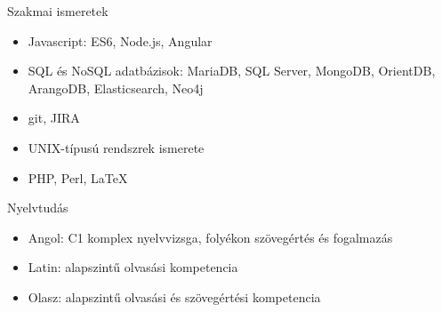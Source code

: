 \documentclass[12pt,oneside,a4paper]{article}
\begin{document}
Szakmai ismeretek

  \begin{itemize}
    \item{ Javascript: ES6, Node.js, Angular }
    \item{ SQL és NoSQL adatbázisok: MariaDB, SQL Server, 
      MongoDB, OrientDB, ArangoDB, Elasticsearch, Neo4j }
    \item{ git, JIRA }
    \item{ UNIX-típusú rendszrek ismerete }
    \item{ PHP, Perl, \LaTeX}
  \end{itemize}

Nyelvtudás
  
  \begin{itemize}
    \item{ Angol: C1 komplex nyelvvizsga, folyékon szövegértés és fogalmazás }
    \item{ Latin: alapszintű olvasási kompetencia }
    \item{ Olasz: alapszintű olvasási és szövegértési kompetencia }
  \end{itemize}

\thispagestyle{fancy}






\end{document}
